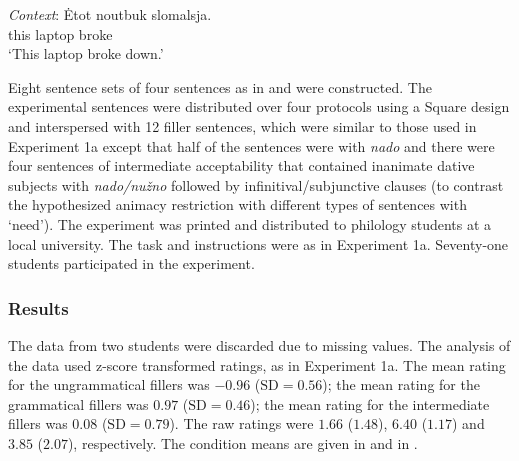 \documentclass[output=paper,colorlinks,citecolor=brown]{langscibook}
\begin{document}
\ea \label{materials-exp1b-inan} \gll \textit{Context}: Ėtot noutbuk slomalsja.\\
{} this laptop broke\\
\glt \hspace{1.3cm} `This laptop broke down.' \\
\z\z

\noindent Eight sentence sets of four sentences as in  and  were constructed. The experimental sentences were distributed over four protocols using a  Square design and interspersed with 12 filler sentences, which were similar to those used in Experiment 1a except that half of the sentences were with \textit{nado} and there were four sentences of intermediate acceptability that contained inanimate dative subjects with \textit{nado/nužno} followed by infinitival/subjunctive clauses (to contrast the hypothesized animacy restriction with different types of sentences with `need'). The experiment was printed and distributed to philology students at a local university. The task and instructions were as in Experiment 1a. Seventy-one students participated in the experiment.

\subsubsection{Results}

The data from two students were discarded due to missing values. The analysis of the data used z-score transformed ratings, as in Experiment 1a. The mean rating for the ungrammatical fillers was $-0.96$ ($\text{SD} =0.56$); the mean rating for the grammatical fillers was $0.97$ ($\text{SD} =0.46$); the mean rating for the intermediate fillers was $0.08$ ($\text{SD} =0.79$). The raw ratings were $1.66$ ($1.48$),  $6.40$ ($1.17$) and $3.85$ ($2.07$), respectively. The condition means are given in  and in .
\end{document}
